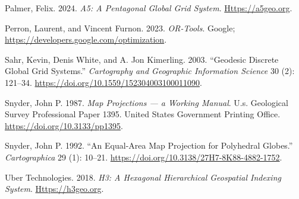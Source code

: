 \documentclass[
  11pt,
  a4paper,
]{article}
\newlength{\cslhangindent}
\newenvironment{CSLReferences}[2] %
 {\begin{list}{}{%
  \setlength{\itemindent}{0pt}
  \setlength{\leftmargin}{0pt}
  \setlength{\parsep}{0pt}
  \ifodd #1
   \setlength{\leftmargin}{\cslhangindent}
   \setlength{\itemindent}{-1\cslhangindent}
  \fi
  \setlength{\itemsep}{#2\baselineskip}}}
 {\end{list}}
\begin{document}
\begin{CSLReferences}{1}{1}
Palmer, Felix. 2024. \emph{A5: A Pentagonal Global Grid System}.
\href{https://a5geo.org}{Https://a5geo.org}.

Perron, Laurent, and Vincent Furnon. 2023. \emph{OR-Tools}. Google;
\url{https://developers.google.com/optimization}.

Sahr, Kevin, Denis White, and A. Jon Kimerling. 2003. {``Geodesic
Discrete Global Grid Systems.''} \emph{Cartography and Geographic
Information Science} 30 (2): 121--34.
\url{https://doi.org/10.1559/152304003100011090}.

Snyder, John P. 1987. \emph{Map Projections --- a Working Manual}. U.s.
Geological Survey Professional Paper 1395. United States Government
Printing Office. \url{https://doi.org/10.3133/pp1395}.

Snyder, John P. 1992. {``An Equal-Area Map Projection for Polyhedral
Globes.''} \emph{Cartographica} 29 (1): 10--21.
\url{https://doi.org/10.3138/27H7-8K88-4882-1752}.

Uber Technologies. 2018. \emph{H3: A Hexagonal Hierarchical Geospatial
Indexing System}. \href{https://h3geo.org}{Https://h3geo.org}.

\end{CSLReferences}
\end{document}

